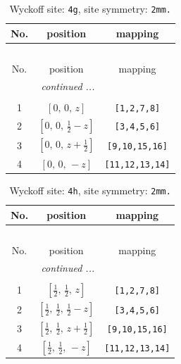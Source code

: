 \documentclass[fleqn,8pt]{jsarticle}
\begin{document}
\begin{longtable}{ccc}
\caption{Wyckoff site: {\tt 4g}, site symmetry: {\tt 2mm.}}
 \\
 \hline \hline
No. & position & mapping \\ \hline \endfirsthead

\multicolumn{2}{l}{\tablename\ \thetable{}} \\
 \hline \hline
No. & position & mapping \\ \hline \endhead

 \hline \hline
\multicolumn{2}{r}{\footnotesize\it continued ...} \\ \endfoot

 \hline \hline
\multicolumn{2}{r}{} \\ \endlastfoot

1 & $\left[ 0,\, 0,\, z \right]$ & {\tt [1,2,7,8]} \\ \hline
2 & $\left[ 0,\, 0,\, \frac{1}{2} - z \right]$ & {\tt [3,4,5,6]} \\ \hline
3 & $\left[ 0,\, 0,\, z + \frac{1}{2} \right]$ & {\tt [9,10,15,16]} \\ \hline
4 & $\left[ 0,\, 0,\, - z \right]$ & {\tt [11,12,13,14]} \\
\end{longtable}
\renewcommand{\arraystretch}{1.2}
\begin{longtable}{ccc}
\caption{Wyckoff site: {\tt 4h}, site symmetry: {\tt 2mm.}}
 \\
 \hline \hline
No. & position & mapping \\ \hline \endfirsthead

\multicolumn{2}{l}{\tablename\ \thetable{}} \\
 \hline \hline
No. & position & mapping \\ \hline \endhead

 \hline \hline
\multicolumn{2}{r}{\footnotesize\it continued ...} \\ \endfoot

 \hline \hline
\multicolumn{2}{r}{} \\ \endlastfoot

1 & $\left[ \frac{1}{2},\, \frac{1}{2},\, z \right]$ & {\tt [1,2,7,8]} \\ \hline
2 & $\left[ \frac{1}{2},\, \frac{1}{2},\, \frac{1}{2} - z \right]$ & {\tt [3,4,5,6]} \\ \hline
3 & $\left[ \frac{1}{2},\, \frac{1}{2},\, z + \frac{1}{2} \right]$ & {\tt [9,10,15,16]} \\ \hline
4 & $\left[ \frac{1}{2},\, \frac{1}{2},\, - z \right]$ & {\tt [11,12,13,14]} \\
\end{longtable}
\end{document}
